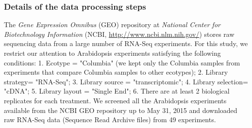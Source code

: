 \documentclass[11pt, a4paper]{article}
\begin{document}
\subsubsection*{Details of the data processing steps}
The \textit{Gene Expression Omnibus} (GEO) repository at \textit{National
Center for Biotechnology Information} (NCBI,
\url{http://www.ncbi.nlm.nih.gov/}) stores raw sequencing data from a large
number of RNA-Seq experiments.  For this study, we restrict our attention to
Arabidopsis experiments satisfying the following conditions: 1.  Ecotype =
"Columbia" (we kept only the Columbia samples from experiments that compare
Columbia samples to other ecotypes); 2. Library strategy= "RNA-Seq"; 3.
Library source = "transcriptomic"; 4.  Library selection= "cDNA"; 5.  Library
layout = "Single End"; 6. There are at least 2 biological replicates for each
treatment. We screened all the Arabidopsis experiments available from the NCBI
GEO repository up to May 31, 2015 and downloaded raw RNA-Seq data (Sequence Read Archive files)
from 49 experiments. %
\end{document}

